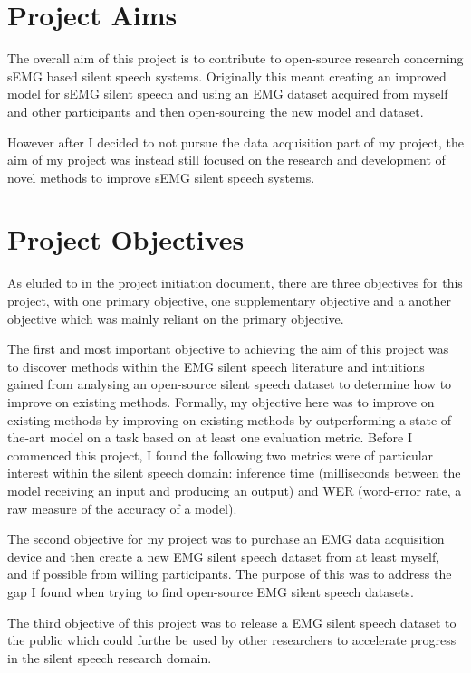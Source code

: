 \section{Project Aims}

The overall aim of this project is to contribute to open-source research concerning
sEMG based silent speech systems. Originally this meant creating an improved model
for sEMG silent speech and using an EMG dataset acquired from myself and other
participants and then open-sourcing the new model and dataset.

However after I decided to not pursue the data acquisition part of my project,
the aim of my project was instead still focused on the research and development
of novel methods to improve sEMG silent speech systems.

\section{Project Objectives}

As eluded to in the project initiation document, there are three objectives
for this project, with one primary objective, one supplementary objective
and a another objective which was mainly reliant on the primary objective.

The first and most important objective to achieving the aim of this project
was to discover methods within the EMG silent speech literature and intuitions
gained from analysing an open-source silent speech dataset to determine how
to improve on existing methods.
Formally, my objective here was to improve on existing methods by improving
on existing methods by outperforming a state-of-the-art model on a task
based on at least one evaluation metric. Before I commenced this project,
I found the following two metrics were of particular interest within the
silent speech domain: inference time (milliseconds between the model
receiving an input and producing an output) and WER (word-error rate,
a raw measure of the accuracy of a model).

The second objective for my project was to purchase an EMG data acquisition
device and then create a new EMG silent speech dataset from at least
myself, and if possible from willing participants. The purpose of this
was to address the gap I found when trying to find open-source EMG silent
speech datasets.

The third objective of this project was to release a EMG silent speech
dataset to the public which could furthe be used by other researchers
to accelerate progress in the silent speech research domain.